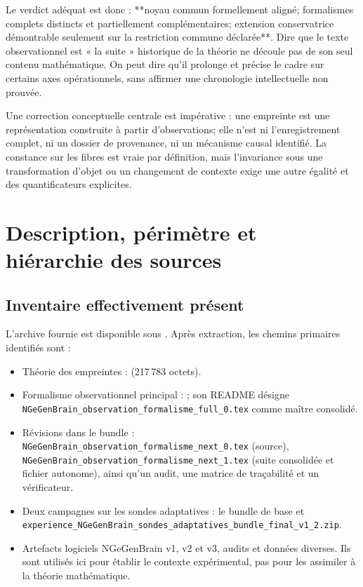 \documentclass[11pt,a4paper,oneside]{report}
\begin{document}
Le verdict adéquat est donc : **noyau commun formellement aligné; formalismes complets distincts et partiellement complémentaires; extension conservatrice démontrable seulement sur la restriction commune déclarée**. Dire que le texte observationnel est « la suite » historique de la théorie ne découle pas de son seul contenu mathématique. On peut dire qu'il prolonge et précise le cadre sur certains axes opérationnels, sans affirmer une chronologie intellectuelle non prouvée.

Une correction conceptuelle centrale est impérative : une empreinte est une représentation construite à partir d'observations; elle n'est ni l'enregistrement complet, ni un dossier de provenance, ni un mécanisme causal identifié. La constance sur les fibres est vraie par définition, mais l'invariance sous une transformation d'objet ou un changement de contexte exige une autre égalité et des quantificateurs explicites.

\chapter{Description, périmètre et hiérarchie des sources}
\section{Inventaire effectivement présent}
L'archive fournie est disponible sous . Après extraction, les chemins primaires identifiés sont :
\begin{itemize}
\item Théorie des empreintes :  (217\,783 octets).
\item Formalisme observationnel principal : ; son README désigne \texttt{NGeGenBrain\_observation\_formalisme\_full\_0.tex} comme maître consolidé.
\item Révisions dans le bundle : \texttt{NGeGenBrain\_observation\_formalisme\_next\_0.tex} (source), \texttt{NGeGenBrain\_observation\_formalisme\_next\_1.tex} (suite consolidée et fichier autonome), ainsi qu'un audit, une matrice de traçabilité et un vérificateur.
\item Deux campagnes sur les sondes adaptatives : le bundle de base et \texttt{experience\_NGeGenBrain\_sondes\_adaptatives\_bundle\_final\_v1\_2.zip}.
\item Artefacts logiciels NGeGenBrain v1, v2 et v3, audits et données diverses. Ils sont utilisés ici pour établir le contexte expérimental, pas pour les assimiler à la théorie mathématique.
\end{itemize}
\end{document}

